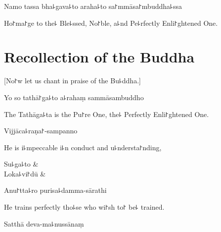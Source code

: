 \vspace{\baselineskip}

Namo tassa bha꜕gava꜕to araha꜕to sa꜓mmāsa꜓mbuddha꜕ssa


\begin{english}
  Ho꜓ma꜓ge to the꜕ Ble꜕ssed, No꜓ble, a꜕nd Pe꜕rfectly Enli꜓ghtened One.

\end{english}

\clearpage


\chapter{Recollection of the Buddha}                %

\begin{leader}
\end{leader}

\begin{english}
  [No꜓w let us chant in praise of the Bu꜕ddha.]
\end{english}

Yo so tathā꜓ga꜕to a꜕rahaṃ sammāsambuddho

\begin{english}
  The Tathāga꜕ta is the Pu꜓re One, the꜕ Perfectly Enli꜓ghtened One.
\end{english}

Vijjāca꜕raṇa꜓-sampanno

\begin{english}
  He is i꜕mpeccable i꜕n conduct and u꜕ndersta꜓nding,
\end{english}

\begin{twochants}
Su꜕ga꜕to & \\
Loka꜕vi꜓dū & \\
\end{twochants}

Anu꜓tta꜕ro purisa꜕damma-sārathi

\begin{english}
  He trains perfectly tho꜕se who wi꜓sh to꜓ be꜕ trained.
\end{english}

Satthā deva-ma꜕nussānaṃ

